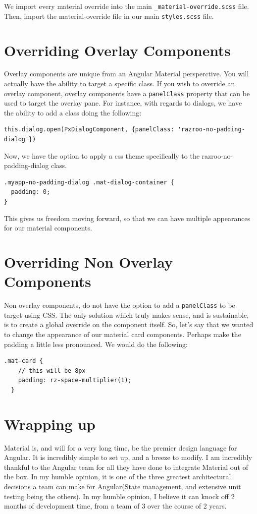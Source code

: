 

We import every material override into the main 
\lstinline{_material-override.scss} file. Then, import the material-override 
file in our main \lstinline{styles.scss} file. 

\section{Overriding Overlay Components}
Overlay components are unique from an Angular Material persperctive. You will
actually have the ability to target a specific class. If you wish to override 
an overlay component, overlay components have a \lstinline{panelClass} property
that can be used to target the overlay pane. For instance, with regards to 
dialogs, we have the ability to add a class doing the following: 
\begin{lstlisting}
this.dialog.open(PxDialogComponent, {panelClass: 'razroo-no-padding-dialog'}) 
\end{lstlisting}

Now, we have the option to apply a css theme specifically to the 
razroo-no-padding-dialog class. 

\begin{lstlisting}
.myapp-no-padding-dialog .mat-dialog-container {
  padding: 0;
}
\end{lstlisting}

This gives us freedom moving forward, so that we can have multiple appearances
for our material components.

\section{Overriding Non Overlay Components}
Non overlay components, do not have the option to add a \lstinline{panelClass}
to be target using CSS. The only solution which truly makes sense, and is 
sustainable, is to create a global override on the component itself. So, let's 
say that we wanted to change the appearance of our material card components. 
Perhaps make the padding a little less pronounced. We would do the following: 
\begin{lstlisting}[caption=\_mat-card.scss override]
  .mat-card {
    // this will be 8px
    padding: rz-space-multiplier(1);
  }
\end{lstlisting}

\section{Wrapping up}
Material is, and will for a very long time, be the premier design language for
Angular. It is incredibly simple to set up, and a breeze to modify. I am 
incredibly thankful to the Angular team for all they have done to integrate 
Material out of the box. In my humble opinion, it is one of the three greatest 
architectural decisions a team can make for Angular(State management, and extensive
unit testing being the others). In my humble opinion, I believe it can knock off 2 
months of development time, from a team of 3 over the course of 2 years. 
